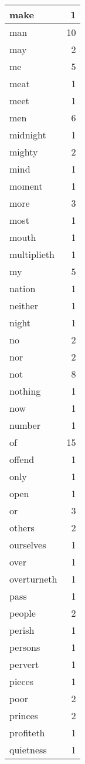 \begin{center}
\begin{longtable}{l|r}
make & 1 \\ \hline
man & 10 \\ \hline
may & 2 \\ \hline
me & 5 \\ \hline
meat & 1 \\ \hline
meet & 1 \\ \hline
men & 6 \\ \hline
midnight & 1 \\ \hline
mighty & 2 \\ \hline
mind & 1 \\ \hline
moment & 1 \\ \hline
more & 3 \\ \hline
most & 1 \\ \hline
mouth & 1 \\ \hline
multiplieth & 1 \\ \hline
my & 5 \\ \hline
nation & 1 \\ \hline
neither & 1 \\ \hline
night & 1 \\ \hline
no & 2 \\ \hline
nor & 2 \\ \hline
not & 8 \\ \hline
nothing & 1 \\ \hline
now & 1 \\ \hline
number & 1 \\ \hline
of & 15 \\ \hline
offend & 1 \\ \hline
only & 1 \\ \hline
open & 1 \\ \hline
or & 3 \\ \hline
others & 2 \\ \hline
ourselves & 1 \\ \hline
over & 1 \\ \hline
overturneth & 1 \\ \hline
pass & 1 \\ \hline
people & 2 \\ \hline
perish & 1 \\ \hline
persons & 1 \\ \hline
pervert & 1 \\ \hline
pieces & 1 \\ \hline
poor & 2 \\ \hline
princes & 2 \\ \hline
profiteth & 1 \\ \hline
quietness & 1 \\ \hline

\end{longtable}
\end{center}
